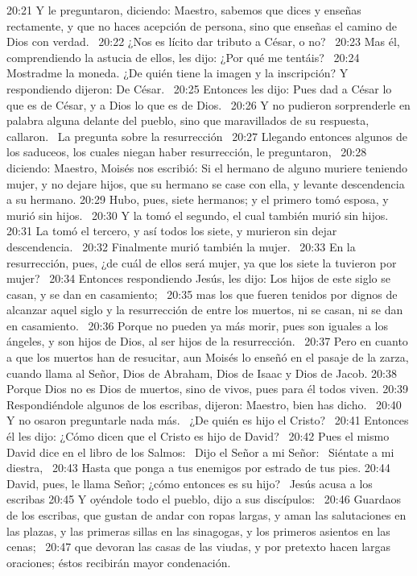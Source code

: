20:21 Y le preguntaron, diciendo: Maestro, sabemos que dices y enseñas rectamente, y que no haces acepción de persona, sino que enseñas el camino de Dios con verdad.  
20:22 ¿Nos es lícito dar tributo a César, o no?  
20:23 Mas él, comprendiendo la astucia de ellos, les dijo: ¿Por qué me tentáis?  
20:24 Mostradme la moneda. ¿De quién tiene la imagen y la inscripción? Y respondiendo dijeron: De César.  
20:25 Entonces les dijo: Pues dad a César lo que es de César, y a Dios lo que es de Dios.  
20:26 Y no pudieron sorprenderle en palabra alguna delante del pueblo, sino que maravillados de su respuesta, callaron.  
La pregunta sobre la resurrección   
20:27 Llegando entonces algunos de los saduceos, los cuales niegan haber resurrección, le preguntaron,  
20:28 diciendo: Maestro, Moisés nos escribió: Si el hermano de alguno muriere teniendo mujer, y no dejare hijos, que su hermano se case con ella, y levante descendencia a su hermano. 
20:29 Hubo, pues, siete hermanos; y el primero tomó esposa, y murió sin hijos.  
20:30 Y la tomó el segundo, el cual también murió sin hijos.  
20:31 La tomó el tercero, y así todos los siete, y murieron sin dejar descendencia.  
20:32 Finalmente murió también la mujer.  
20:33 En la resurrección, pues, ¿de cuál de ellos será mujer, ya que los siete la tuvieron por mujer?  
20:34 Entonces respondiendo Jesús, les dijo: Los hijos de este siglo se casan, y se dan en casamiento;  
20:35 mas los que fueren tenidos por dignos de alcanzar aquel siglo y la resurrección de entre los muertos, ni se casan, ni se dan en casamiento.  
20:36 Porque no pueden ya más morir, pues son iguales a los ángeles, y son hijos de Dios, al ser hijos de la resurrección.  
20:37 Pero en cuanto a que los muertos han de resucitar, aun Moisés lo enseñó en el pasaje de la zarza, cuando llama al Señor, Dios de Abraham, Dios de Isaac y Dios de Jacob. 
20:38 Porque Dios no es Dios de muertos, sino de vivos, pues para él todos viven. 
20:39 Respondiéndole algunos de los escribas, dijeron: Maestro, bien has dicho.  
20:40 Y no osaron preguntarle nada más.  
¿De quién es hijo el Cristo?   
20:41 Entonces él les dijo: ¿Cómo dicen que el Cristo es hijo de David?  
20:42 Pues el mismo David dice en el libro de los Salmos:  
Dijo el Señor a mi Señor:  
Siéntate a mi diestra,  
20:43 Hasta que ponga a tus enemigos por estrado de tus pies. 
20:44 David, pues, le llama Señor; ¿cómo entonces es su hijo?  
Jesús acusa a los escribas  
20:45 Y oyéndole todo el pueblo, dijo a sus discípulos:  
20:46 Guardaos de los escribas, que gustan de andar con ropas largas, y aman las salutaciones en las plazas, y las primeras sillas en las sinagogas, y los primeros asientos en las cenas;  
20:47 que devoran las casas de las viudas, y por pretexto hacen largas oraciones; éstos recibirán mayor condenación.  
